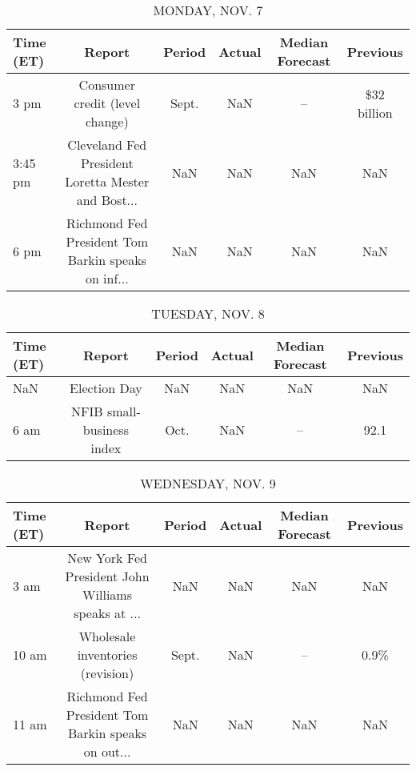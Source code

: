 \documentclass{article}%
\begin{document}
%
\normalsize%


\begin{table}[htbp]%
\caption{MONDAY, NOV. 7}%
\centering%
\begin{adjustbox}{width=1\textwidth}%
\begin{tabular}{lccccc}
\toprule
Time (ET) &                                             Report & Period & Actual & Median Forecast &    Previous \\
\midrule
     3 pm &                     Consumer credit (level change) &  Sept. &    NaN &              -- & \$32 billion \\
  3:45 pm & Cleveland Fed President Loretta Mester and Bost... &    NaN &    NaN &             NaN &         NaN \\
     6 pm & Richmond Fed President Tom Barkin speaks on inf... &    NaN &    NaN &             NaN &         NaN \\
\bottomrule
\end{tabular}
%
\end{adjustbox}%
\end{table}

%


\begin{table}[htbp]%
\caption{TUESDAY, NOV. 8}%
\centering%
\begin{adjustbox}{width=1\textwidth}%
\begin{tabular}{lccccc}
\toprule
Time (ET) &                    Report & Period & Actual & Median Forecast & Previous \\
\midrule
      NaN &              Election Day &    NaN &    NaN &             NaN &      NaN \\
     6 am & NFIB small-business index &   Oct. &    NaN &              -- &     92.1 \\
\bottomrule
\end{tabular}
%
\end{adjustbox}%
\end{table}

%


\begin{table}[htbp]%
\caption{WEDNESDAY, NOV. 9}%
\centering%
\begin{adjustbox}{width=1\textwidth}%
\begin{tabular}{lccccc}
\toprule
Time (ET) &                                             Report & Period & Actual & Median Forecast & Previous \\
\midrule
     3 am & New York Fed President John Williams speaks at ... &    NaN &    NaN &             NaN &      NaN \\
    10 am &                   Wholesale inventories (revision) &  Sept. &    NaN &              -- &     0.9\% \\
    11 am & Richmond Fed President Tom Barkin speaks on out... &    NaN &    NaN &             NaN &      NaN \\
\bottomrule
\end{tabular}
%
\end{adjustbox}%
\end{table}
\end{document}
